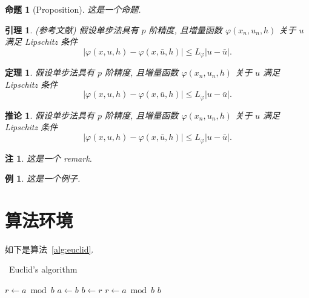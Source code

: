 \documentclass[openany,twoside,12pt]{book}
\makeatletter
\theoremstyle{plain}
\newtheorem{proposition}{命题}[chapter]
\newtheorem{lemma}{引理}[chapter]
\newtheorem{theorem}{定理}[chapter]
\newtheorem{example}{例}[chapter]
\newtheorem{corollary}{推论}[chapter]
\newtheorem{remark}{注}[chapter]
\renewcommand{\proofname}{证明}
\renewenvironment{proof}[1][\proofname]{\par
  \pushQED{\qed}%
  \normalfont \topsep6\p@\@plus6\p@\relax
  \trivlist
  \item[\hskip\labelsep
        \bfseries
    #1\@addpunct{\,:\,}]\ignorespaces
}{%
  \popQED\endtrivlist\@endpefalse
}
\makeatother
\begin{document}
\begin{proposition}[Proposition]
这是一个命题.
\end{proposition}

\begin{lemma}\label{lemma-convergence} {\rm (\textit{参考文献}\cite{LiLiu1997})}
假设单步法具有 $p$ 阶精度, 且増量函数 $\varphi(x_{n}, u_{n}, h)$ 关于 $u$ 满足 {\rm Lipschitz} 条件
\begin{equation}\label{eqn:3}
|\varphi(x, u, h)-\varphi(x, \bar{u}, h)| \leqslant L_{\varphi}|u-\bar{u}|.
\end{equation}
\end{lemma}

\begin{theorem}\label{theorem-convergence}
假设单步法具有 $p$ 阶精度, 且増量函数 $\varphi(x_{n}, u_{n}, h)$ 关于 $u$ 满足 {\rm Lipschitz} 条件
\begin{equation}\label{eqn:4}
|\varphi(x, u, h)-\varphi(x, \bar{u}, h)| \leqslant L_{\varphi}|u-\bar{u}|.
\end{equation}
\end{theorem}

\begin{corollary}\label{col-convergence}
假设单步法具有 $p$ 阶精度, 且増量函数 $\varphi(x_{n}, u_{n}, h)$ 关于 $u$ 满足 {\rm Lipschitz} 条件
\begin{equation}\label{eqn:5}
|\varphi(x, u, h)-\varphi(x, \bar{u}, h)| \leqslant L_{\varphi}|u-\bar{u}|.
\end{equation}
\end{corollary}


\begin{remark}\label{remark1}
这是一个 remark.
\end{remark}

\begin{example}
这是一个例子.
\end{example}


\section{算法环境}

如下是算法~\ref{alg:euclid}.
\begin{algorithm}[H]
    \small
    \caption{~Euclid's algorithm}\label{alg:euclid}
    \begin{algorithmic}[1]
        \State $r\gets a\bmod b$
        \State $a\gets b$
        \State $b\gets r$
        \State $r\gets a\bmod b$
        \EndWhile\label{euclidendwhile}
        \State \Return $b$
        \EndProcedure
    \end{algorithmic}
\end{algorithm}
\end{document}
